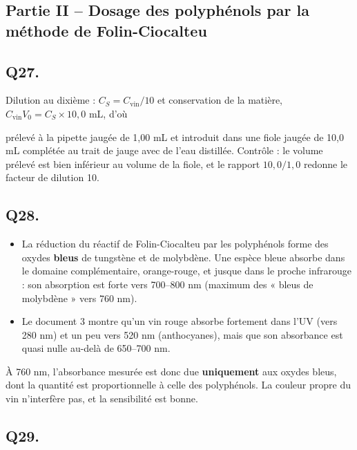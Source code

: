 \documentclass[11pt,a4paper]{article}
\providecommand{\tightlist}{\setlength{\itemsep}{0pt}\setlength{\parskip}{0pt}}
\newcommand{\equationajustee}[1]{%
  \sbox{\boiteequation}{$\displaystyle #1$}%
  \ifdim\wd\boiteequation>\linewidth
    \[\resizebox{\linewidth}{!}{\usebox{\boiteequation}}\]%
  \else
    \[#1\]%
  \fi}
\begin{document}
\hypertarget{partie-ii-dosage-des-polyphuxe9nols-par-la-muxe9thode-de-folin-ciocalteu}{%
\subsection{Partie II -- Dosage des polyphénols par la méthode de Folin-Ciocalteu}\label{partie-ii-dosage-des-polyphuxe9nols-par-la-muxe9thode-de-folin-ciocalteu}}

\hypertarget{q27.}{%
\subsection{Q27.}\label{q27.}}

Dilution au dixième : \(C_S=C_{\text{vin}}/10\) et conservation de la matière, \(C_{\text{vin}}V_0=C_S\times10{,}0\) mL, d'où

\equationajustee{\boxed{V_0=\frac{10{,}0\ \text{mL}}{10}=1{,}0\ \text{mL}}}

prélevé à la pipette jaugée de 1,00 mL et introduit dans une fiole jaugée de 10,0 mL complétée au trait de jauge avec de l'eau distillée. Contrôle : le volume prélevé est bien inférieur au volume de la fiole, et le rapport \(10{,}0/1{,}0\) redonne le facteur de dilution 10.

\hypertarget{q28.}{%
\subsection{Q28.}\label{q28.}}

\begin{itemize}
\tightlist
\item
  La réduction du réactif de Folin-Ciocalteu par les polyphénols forme des oxydes \textbf{bleus} de tungstène et de molybdène. Une espèce bleue absorbe dans le domaine complémentaire, orange-rouge, et jusque dans le proche infrarouge : son absorption est forte vers 700--800 nm (maximum des « bleus de molybdène » vers 760 nm).
\item
  Le document 3 montre qu'un vin rouge absorbe fortement dans l'UV (vers 280 nm) et un peu vers 520 nm (anthocyanes), mais que son absorbance est quasi nulle au-delà de 650--700 nm.
\end{itemize}

À 760 nm, l'absorbance mesurée est donc due \textbf{uniquement} aux oxydes bleus, dont la quantité est proportionnelle à celle des polyphénols. La couleur propre du vin n'interfère pas, et la sensibilité est bonne.

\hypertarget{q29.}{%
\subsection{Q29.}\label{q29.}}
\end{document}
